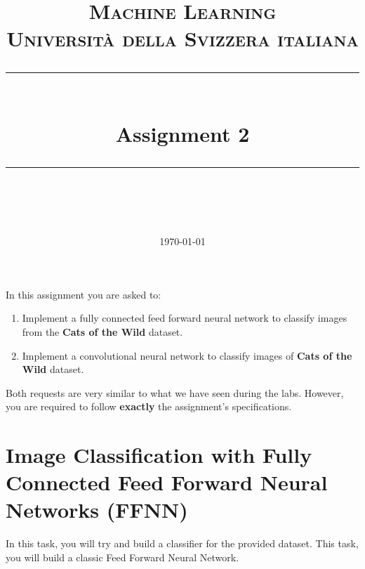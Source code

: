 \documentclass[11pt]{scrartcl}
\title{	
	\normalfont\normalsize
	\textsc{Machine Learning\\%
	Universit\`a della Svizzera italiana}\\
	\vspace{25pt}
	\rule{\linewidth}{0.5pt}\\
	\vspace{20pt}
	{\huge Assignment 2}\\
	\vspace{12pt}
	\rule{\linewidth}{1pt}\\
	\vspace{12pt}
}
\author{\LARGE \thestudent}
\date{\normalsize\today}
\begin{document}
\maketitle

In this assignment you are asked to:

\begin{enumerate}
\item Implement a fully connected feed forward neural network to classify images from the \textbf{Cats of the Wild} dataset.
\item Implement a convolutional neural network to classify images of \textbf{Cats of the Wild} dataset.
\end{enumerate}

Both requests are very similar to what we have seen during the labs. However, you are required to follow \textbf{exactly} the assignment's specifications.

\section{Image Classification with Fully Connected Feed Forward Neural Networks (FFNN)}

In this task, you will try and build a classifier for the provided dataset. This task, you will build a classic Feed Forward Neural Network.
\end{document}
